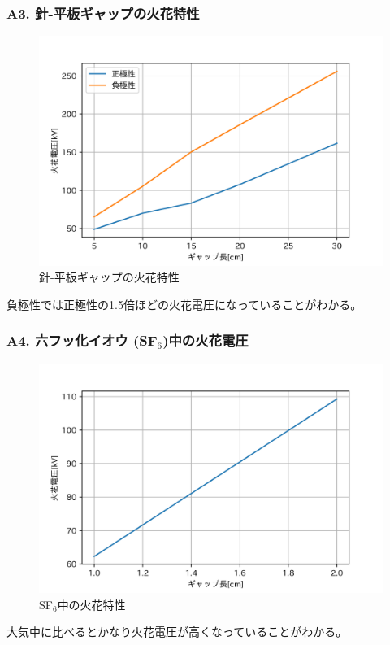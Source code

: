 \documentclass[dvipdfmx, twocolumn]{jsarticle}
\begin{document}
\subsubsection*{A3. 針-平板ギャップの火花特性}
\begin{figure}[H]
\begin{center}
\includegraphics[scale = 0.5]{A3.png}
\caption{針-平板ギャップの火花特性}
\end{center}
\end{figure}
負極性では正極性の1.5倍ほどの火花電圧になっていることがわかる。

\subsubsection*{A4. 六フッ化イオウ (SF$_{6}$)中の火花電圧}

\begin{figure}[H]
\begin{center}
\includegraphics[scale = 0.5]{A4.png}
\caption{SF$_{6}$中の火花特性}
\end{center}
\end{figure}
大気中に比べるとかなり火花電圧が高くなっていることがわかる。
\end{document}
